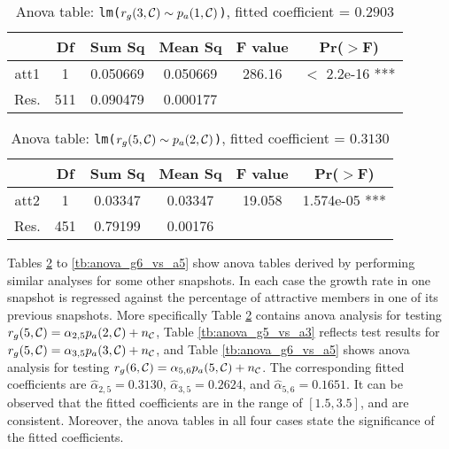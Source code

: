 \begin{table}
\caption{Anova table: \texttt{lm($r_g(3,\mathcal{C}) \sim p_a(1,\mathcal{C})$)}, fitted coefficient = $0.2903$}
\begin{center}
\begin{tabular}{c|c|c|c|c|c}
    &  Df  & Sum Sq & Mean Sq & F value &   Pr($>$F) \\ \hline
att1     &{\small  1 }& {\small 0.050669} & {\small 0.050669}  & {\small 286.16} &  $<$ {\small 2.2e-16 ***}\\ \hline
Res. & {\small 511} & {\small 0.090479} & {\small 0.000177}  & &
\end{tabular}
\end{center}
\label{tb:anova_g3_vs_a1}
\end{table}





\begin{table}
\caption{Anova table: \texttt{lm($r_g(5,\mathcal{C}) \sim p_a(2,\mathcal{C})$)}, fitted coefficient = $0.3130$}
\begin{center}
\begin{tabular}{c|c|c|c|c|c}
         &  Df  & Sum Sq & Mean Sq & F value &   Pr($>$F)    \\ \hline
att2 &    1 & 0.03347 & 0.03347 & 19.058 & 1.574e-05 ***\\ \hline
Res. & 451 & 0.79199 & 0.00176 & \\
\end{tabular}
\end{center}
\label{tb:anova_g5_vs_a2}
\end{table}






Tables \ref{tb:anova_g5_vs_a2} to \ref{tb:anova_g6_vs_a5} show anova tables derived by performing similar analyses for some other snapshots.   In each case the growth rate in one snapshot is regressed against the percentage of attractive members in one of its previous snapshots. More specifically Table \ref{tb:anova_g5_vs_a2} contains anova analysis for testing $r_g(5,\mathcal{C}) = \alpha_{2,5} p_a(2,\mathcal{C}) + n_{\mathcal{C}}$, Table \ref{tb:anova_g5_vs_a3} reflects test results for $r_g(5,\mathcal{C}) = \alpha_{3,5} p_a(3,\mathcal{C}) + n_{\mathcal{C}}$, and Table \ref{tb:anova_g6_vs_a5} shows anova analysis for testing $r_g(6,\mathcal{C}) = \alpha_{5,6} p_a(5,\mathcal{C}) + n_{\mathcal{C}}$. The corresponding fitted coefficients are $\hat{\alpha}_{2,5}=0.3130$, $\hat{\alpha}_{3,5}=0.2624$, and $\hat{\alpha}_{5,6}=0.1651$. It can be observed that the fitted coefficients are in the range of $[1.5,3.5]$, and are  consistent. Moreover, the anova tables in all four cases state the significance of the fitted coefficients. 

